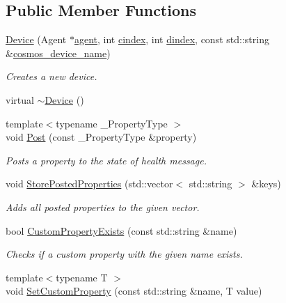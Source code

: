 \subsection*{Public Member Functions}
\begin{DoxyCompactItemize}
\item 
\hyperlink{classcubesat_1_1Device_a19869b78d586dff676fa6ef25ccaa779}{Device} (Agent $\ast$\hyperlink{classcubesat_1_1Device_a8499108eccaf7375bea8ead0182391a6}{agent}, int \hyperlink{classcubesat_1_1Device_a1deca725b01f8ef37e49662da6db4e53}{cindex}, int \hyperlink{classcubesat_1_1Device_a8a2b3d6d7400e6796c31705058172982}{dindex}, const std\+::string \&\hyperlink{classcubesat_1_1Device_a90904a89fe9cf559e50028a7d0cb878f}{cosmos\+\_\+device\+\_\+name})
\begin{DoxyCompactList}\small\item\em Creates a new device. \end{DoxyCompactList}\item 
virtual \hyperlink{classcubesat_1_1Device_a60a17b504ad734b977d4d87b2f0151f0}{$\sim$\+Device} ()
\item 
{\footnotesize template$<$typename \+\_\+\+Property\+Type $>$ }\\void \hyperlink{classcubesat_1_1Device_a307f4f199eb01b10e44e3b6a42034349}{Post} (const \+\_\+\+Property\+Type \&property)
\begin{DoxyCompactList}\small\item\em Posts a property to the state of health message. \end{DoxyCompactList}\item 
void \hyperlink{classcubesat_1_1Device_ae273ac30edc470b3623853d74fd22e90}{Store\+Posted\+Properties} (std\+::vector$<$ std\+::string $>$ \&keys)
\begin{DoxyCompactList}\small\item\em Adds all posted properties to the given vector. \end{DoxyCompactList}\item 
bool \hyperlink{classcubesat_1_1Device_a7174eacedcecf65bbf2d7ad0f28d10e1}{Custom\+Property\+Exists} (const std\+::string \&name)
\begin{DoxyCompactList}\small\item\em Checks if a custom property with the given name exists. \end{DoxyCompactList}\item 
{\footnotesize template$<$typename T $>$ }\\void \hyperlink{classcubesat_1_1Device_a586d450c984461a04503e895758cafcb}{Set\+Custom\+Property} (const std\+::string \&name, T value)

\end{DoxyCompactItemize}

